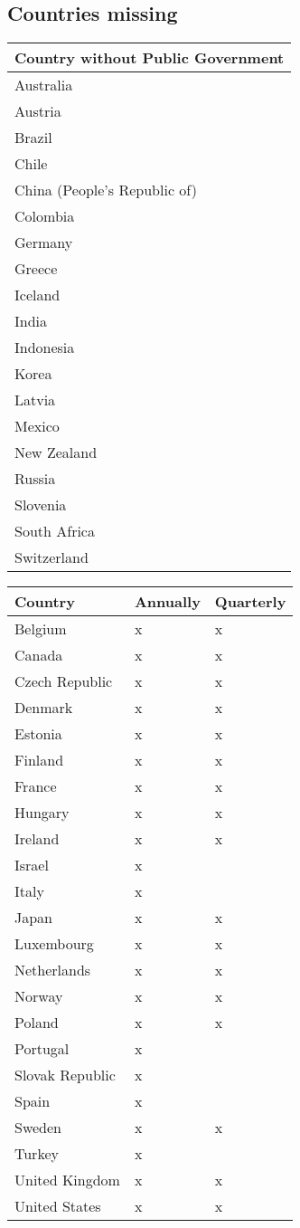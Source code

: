 \documentclass[a4paper]{article}
\begin{document}
\subsection{Countries missing}
\label{sec-2-6}

\begin{center}
\begin{tabular}{l}
Country without Public Government\\
\hline
Australia\\
Austria\\
Brazil\\
Chile\\
China (People's Republic of)\\
Colombia\\
Germany\\
Greece\\
Iceland\\
India\\
Indonesia\\
Korea\\
Latvia\\
Mexico\\
New Zealand\\
Russia\\
Slovenia\\
South Africa\\
Switzerland\\
\end{tabular}
\end{center}

\begin{center}
\begin{tabular}{lll}
Country & Annually & Quarterly\\
\hline
Belgium & x & x\\
Canada & x & x\\
Czech Republic & x & x\\
Denmark & x & x\\
Estonia & x & x\\
Finland & x & x\\
France & x & x\\
Hungary & x & x\\
Ireland & x & x\\
Israel & x & \\
Italy & x & \\
Japan & x & x\\
Luxembourg & x & x\\
Netherlands & x & x\\
Norway & x & x\\
Poland & x & x\\
Portugal & x & \\
Slovak Republic & x & \\
Spain & x & \\
Sweden & x & x\\
Turkey & x & \\
United Kingdom & x & x\\
United States & x & x\\
\end{tabular}
\end{center}
\end{document}
